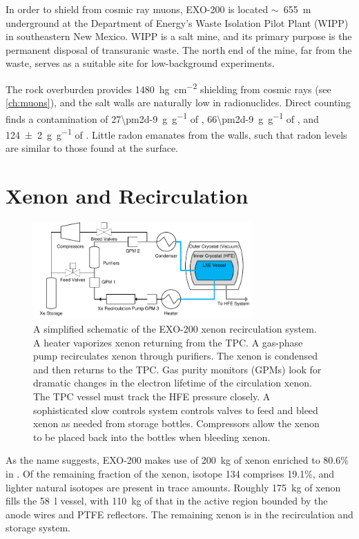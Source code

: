 \documentclass[herrin-thesis.tex]{subfiles}
\begin{document}
In order to shield from cosmic ray muons, EXO-200 is located \(\sim\)~\SI{655}{\m} underground at the Department of Energy's Waste Isolation Pilot Plant (WIPP) in southeastern New Mexico. WIPP is a salt mine, and its primary purpose is the permanent disposal of transuranic waste. The north end of the mine, far from the waste, serves as a suitable site for low-background experiments.

The rock overburden provides \SI{1480}{\hecto\g\per\square\cm} shielding from cosmic rays (see \cref{ch:muons}), and the salt walls are naturally low in radionuclides. Direct counting finds a contamination of \SI[per-mode=symbol]{27\pm2d-9}{\g\per\g} of , \SI[per-mode=symbol]{66\pm2d-9}{\g\per\g} of , and \SI[per-mode=symbol]{124\pm2}{\g\per\g} of \cite{Auger:2012dq}. Little radon emanates from the walls, such that radon levels are similar to those found at the surface.

\section{Xenon and Recirculation}

\begin{figure}
\centering
\includegraphics[width=0.75\textwidth]{./figures/detector_simplified_xe.pdf}
\caption[The EXO-200 xenon recirculation system]{A simplified schematic of the EXO-200 xenon recirculation system. A heater vaporizes xenon returning from the TPC. A gas-phase pump recirculates xenon through purifiers. The xenon is condensed and then returns to the TPC. Gas purity monitors (GPMs) look for dramatic changes in the electron lifetime of the circulation xenon. The TPC vessel must track the HFE pressure closely. A sophisticated slow controls system controls valves to feed and bleed xenon as needed from storage bottles. Compressors allow the xenon to be placed back into the bottles when bleeding xenon.}
\label{fig:detector_simplified_xe}
\end{figure}

As the name suggests, EXO-200 makes use of \SI{200}{\kg} of xenon enriched to 80.6\% in . Of the remaining fraction of the xenon, isotope 134 comprises 19.1\%, and lighter natural isotopes are present in trace amounts. Roughly \SI{175}{\kg} of xenon fills the \SI{58}{\l} vessel, with \SI{110}{\kg} of that in the active region bounded by the anode wires and PTFE reflectors. The remaining xenon is in the recirculation and storage system.
\end{document}
